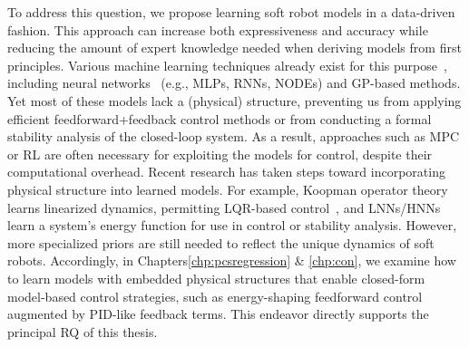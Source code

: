To address this question, we propose learning soft robot models in a data-driven fashion. This approach can increase both expressiveness and accuracy while reducing the amount of expert knowledge needed when deriving models from first principles. Various machine learning techniques already exist for this purpose~\citep{armanini2023soft, kim2021review, chen2024data}, including neural networks~\citep{thuruthel2017learning} (e.g., \glspl{MLP}, \glspl{RNN}\citep{schafke2024learning}, \glspl{NODE}) and \gls{GP}-based methods\citep{sabelhaus2021gaussian}. Yet most of these models lack a (physical) structure, preventing us from applying efficient feedforward+feedback control methods or from conducting a formal stability analysis of the closed-loop system. As a result, approaches such as \gls{MPC}\citep{gillespie2018learning, alora2023robust, schafke2024learning} or \gls{RL}\citep{thuruthel2018model} are often necessary for exploiting the models for control, despite their computational overhead.
%
Recent research has taken steps toward incorporating physical structure into learned models. For example, Koopman operator theory learns linearized dynamics, permitting \gls{LQR}-based control~\citep{bruder2020data}, and \glspl{LNN}/\glspl{HNN}\citep{lutter2019deep} learn a system’s energy function for use in control or stability analysis. However, more specialized priors are still needed to reflect the unique dynamics of soft robots. Accordingly, in Chapters\ref{chp:pcsregression} \& \ref{chp:con}, we examine how to learn models with embedded physical structures that enable closed-form model-based control strategies, such as energy-shaping feedforward control augmented by PID-like feedback terms. This endeavor directly supports the principal \gls{RQ} of this thesis.


